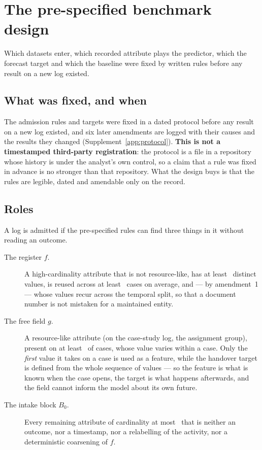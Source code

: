 
\section{The pre-specified benchmark design}
\label{sec:design}

Which datasets enter, which recorded attribute plays the predictor, which the
forecast target and which the baseline were fixed by written rules before any
result on a new log existed.

\subsection{What was fixed, and when}

The admission rules and targets were fixed in a dated protocol before any
result on a new log existed, and six later amendments are logged with their causes
and the results they changed (Supplement~\ref{app:protocol}). \textbf{This is
not a timestamped third-party registration}: the protocol is a file in a
repository whose history is under the analyst's own control, so a claim that
a rule was fixed in advance is no stronger than that repository. What the
design buys is that the rules are legible, dated and amendable only on the
record.

\subsection{Roles}

A log is admitted if the pre-specified rules can find three things in it
without reading an outcome.

\begin{description}
\item[The register $f$.] A high-cardinality attribute that is not
resource-like, has at least \minCardF\ distinct values, is reused across at
least \minReuseF\ cases on average, and --- by amendment~1 --- whose values
recur across the temporal split, so that a document number is not mistaken for
a maintained entity.
\item[The free field $g$.] A resource-like attribute (on the case-study log,
the assignment group), present on at least \minGPresent\ of cases, whose
value varies within a case. Only the \emph{first} value it takes on a case is
used as a feature, while the handover target is defined from the whole
sequence of values --- so the feature is what is known when the case opens,
the target is what happens afterwards, and the field cannot inform the model
about its own future.
\item[The intake block $B_0$.] Every remaining attribute of cardinality at
most \maxCardBZero\ that is neither an outcome, nor a timestamp, nor a
relabelling of the activity, nor a deterministic coarsening of $f$.
\end{description}

